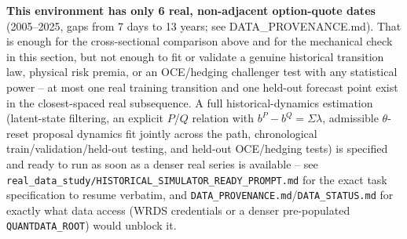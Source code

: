 \textbf{This environment has only 6 real, non-adjacent option-quote dates}
(2005--2025, gaps from 7 days to 13 years; see
DATA\_PROVENANCE.md). That is enough for the cross-sectional comparison
above and for the mechanical check in this section, but not enough to fit
or validate a genuine historical transition law, physical risk premia, or
an OCE/hedging challenger test with any statistical power -- at most one
real training transition and one held-out forecast point exist in the
closest-spaced real subsequence. A full historical-dynamics estimation
(latent-state filtering, an explicit $P$/$Q$ relation with
$b^P-b^Q=\Sigma\lambda$, admissible $\theta$-reset proposal dynamics fit
jointly across the path, chronological train/validation/held-out testing,
and held-out OCE/hedging tests) is specified and ready to run as soon as a
denser real series is available -- see
\texttt{real\_data\_study/HISTORICAL\_SIMULATOR\_READY\_PROMPT.md} for the
exact task specification to resume verbatim, and
\texttt{DATA\_PROVENANCE.md}/\texttt{DATA\_STATUS.md} for exactly what
data access (WRDS credentials or a denser pre-populated
\texttt{QUANTDATA\_ROOT}) would unblock it.
